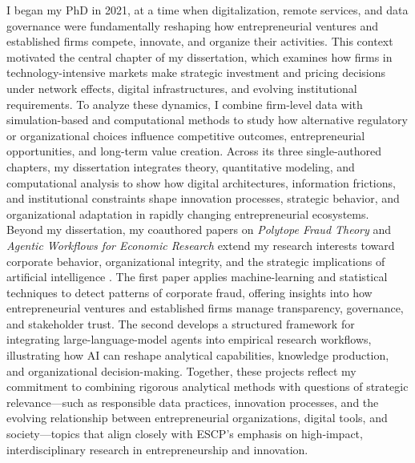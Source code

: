 \documentclass{nfr}
\begin{document}
I began my PhD in 2021, at a time when digitalization, remote services, and data governance were fundamentally reshaping how entrepreneurial ventures and established firms compete, innovate, and organize their activities. 
This context motivated the central chapter of my dissertation, which examines how firms in technology-intensive markets make strategic investment and pricing decisions under network effects, digital infrastructures, and evolving institutional requirements. 
To analyze these dynamics, I combine firm-level data with simulation-based and computational methods to study how alternative regulatory or organizational choices influence competitive outcomes, entrepreneurial opportunities, and long-term value creation. 
Across its three single-authored chapters, my dissertation integrates theory, quantitative modeling, and computational analysis to show how digital architectures, information frictions, and institutional constraints shape innovation processes, strategic behavior, and organizational adaptation in rapidly changing entrepreneurial ecosystems.\\

Beyond my dissertation, my coauthored papers on \textit{Polytope Fraud Theory} and \textit{Agentic Workflows for Economic Research} extend my research interests toward corporate behavior, organizational integrity, and the strategic implications of artificial intelligence \citep{Zhao2025, Dawid2025}. 
The first paper applies machine-learning and statistical techniques to detect patterns of corporate fraud, offering insights into how entrepreneurial ventures and established firms manage transparency, governance, and stakeholder trust. 
The second develops a structured framework for integrating large-language-model agents into empirical research workflows, illustrating how AI can reshape analytical capabilities, knowledge production, and organizational decision-making. 
Together, these projects reflect my commitment to combining rigorous analytical methods with questions of strategic relevance—such as responsible data practices, innovation processes, and the evolving relationship between entrepreneurial organizations, digital tools, and society—topics that align closely with ESCP’s emphasis on high-impact, interdisciplinary research in entrepreneurship and innovation.\\
\end{document}
